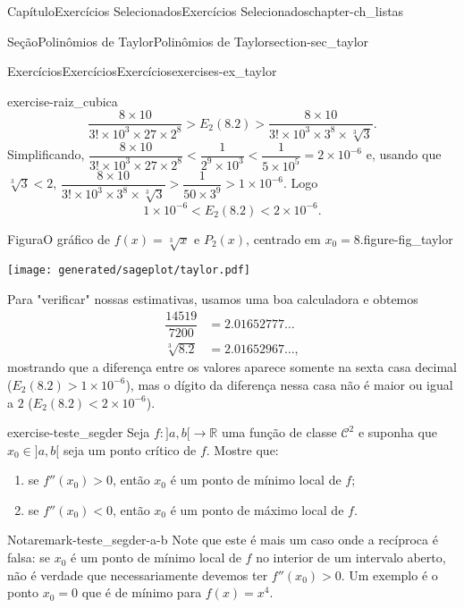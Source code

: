 \documentclass[oneside,10pt,]{book}
\numberwithin{equation}{section}
\newcommand{\R}{\mathbb R}
\newcommand{\amp}{&}
\begin{document}
\begin{chapterptx}{Capítulo}{Exercícios Selecionados}{}{Exercícios Selecionados}{}{}{chapter-ch_listas}
\begin{sectionptx}{Seção}{Polinômios de Taylor}{}{Polinômios de Taylor}{}{}{section-sec_taylor}
\begin{exercises-subsection-numberless}{Exercícios}{Exercícios}{}{Exercícios}{}{}{exercises-ex_taylor}
\begin{divisionexercise}{1}{}{}{exercise-raiz_cubica}
\begin{equation*}
\dfrac{8\times
10}{3!\times 10^3\times 27\times 2^8}>E_2(8.2)>
\dfrac{8\times 10}{3!\times
10^3\times3^8\times\sqrt[3]{3}}.
\end{equation*}
Simplificando, \(\dfrac{8\times 10}{3!\times 10^3\times 27\times
2^8}<\dfrac{1}{2^9\times 10^3}<\dfrac{1}{5\times
10^5}=2\times 10^{-6}\) e, usando que \(\sqrt[3]{3}<
2\), \(\dfrac{8\times 10}{3!\times
10^3\times3^8\times\sqrt[3]{3}}>\dfrac{1}{50\times
3^9}>1\times 10^{-6}\). Logo%
\begin{equation*}
\boxed{1\times
10^{-6}<E_2(8.2)<2\times 10^{-6}.}
\end{equation*}
\begin{figureptx}{Figura}{O gráfico de \(f(x)=\sqrt[3]{x}\) e \(P_2(x)\), centrado em \(x_0=8\).}{figure-fig_taylor}{}%
\begin{image}{0.25}{0.5}{0.25}{}%
\texttt{[image: generated/sageplot/taylor.pdf]}%
\end{image}%
\tcblower
\end{figureptx}%
%
\par
Para "verificar" nossas estimativas, usamos uma boa calculadora e obtemos%
\begin{align*}
\dfrac{14519}{7200}\amp = 2.01652777\ldots\\
\sqrt[3]{8.2}      \amp = 2.01652967\ldots,
\end{align*}
mostrando que a diferença entre os valores aparece somente na sexta casa decimal (\(E_2(8.2)> 1\times 10^{-6}\)), mas o dígito da diferença nessa casa não é maior ou igual a \(2\) (\(E_2(8.2)<2\times 10^{-6}\)).%
\end{divisionexercise}%
\begin{divisionexercise}{7}{}{}{exercise-teste_segder}%
Seja \(f\colon]a,b[\to\R\) uma função de classe \(\mathscr{C}^2\) e suponha que \(x_0\in]a,b[\) seja um ponto crítico de \(f\). Mostre que:%
\begin{enumerate}[label=\alph*]
\item{}se \(f'' (x_ 0)>0\), então \(x_ 0\) é um ponto de mínimo local de \(f\);%
\item{}se \(f'' (x_ 0)<0\), então \(x_ 0\) é um ponto de máximo local de \(f\).%
\end{enumerate}
%
\begin{remark}{Nota}{}{remark-teste_segder-a-b}%
Note que este é mais um caso onde a recíproca é falsa: se \(x_0\) é um ponto de mínimo local de \(f\) no interior de um intervalo aberto, não é verdade que necessariamente devemos ter \(f''(x_0)>0\). Um exemplo é o ponto \(x_0=0\) que é de mínimo para \(f(x)=x^4\).%

\end{remark}
\end{divisionexercise}
\end{exercises-subsection-numberless}
\end{sectionptx}
\end{chapterptx}
\end{document}
